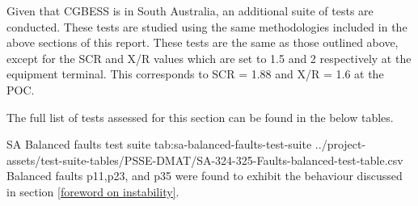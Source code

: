 \documentclass{../grid-link-report}
\newcommand{\projectassetsdir}{../project-assets}
\begin{document}
	Given that \ac{CGBESS} is in South Australia, an additional suite of tests are conducted. These tests are studied using the same methodologies included in the above sections of this report. These tests are the same as those outlined above, except for the \ac{SCR} and X/R values which are set to 1.5 and 2 respectively at the equipment terminal. This corresponds to SCR = 1.88 and X/R = 1.6 at the POC. 
	
	
	The full list of tests assessed for this section can be found in the below tables. 
	
	{
		\fontsize{6}{8}\selectfont
		\autoscaledlongtable
		{SA Balanced faults test suite}
		{tab:sa-balanced-faults-test-suite}
		{\projectassetsdir/test-suite-tables/PSSE-DMAT/SA-324-325-Faults-balanced-test-table.csv}
	}
	Balanced faults p11,p23, and p35 were found to exhibit the behaviour discussed in section \ref{foreword on instability}.
\end{document}
